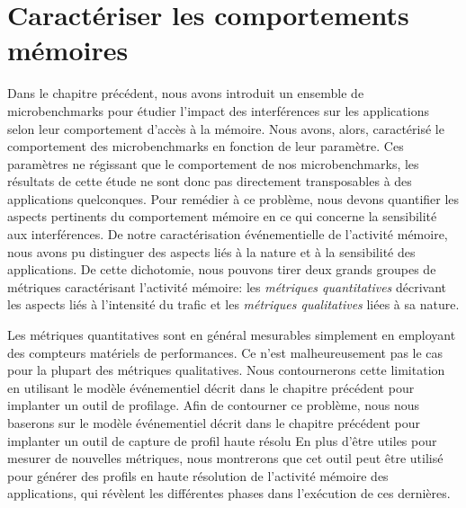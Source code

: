 
\chapter{\label{chapitre:caracterisation} Caractériser les comportements mémoires}



Dans le chapitre précédent, nous avons introduit un ensemble de microbenchmarks pour étudier l'impact des interférences sur les applications selon leur comportement d'accès à la mémoire.
Nous avons, alors, caractérisé le comportement des microbenchmarks en fonction de leur paramètre.
Ces paramètres ne régissant que le comportement de nos microbenchmarks, les résultats de cette étude ne sont donc pas directement transposables à des applications quelconques.
Pour remédier à ce problème, nous devons quantifier les aspects pertinents du comportement mémoire en ce qui concerne la sensibilité aux interférences.
De notre caractérisation événementielle de l'activité mémoire, nous avons pu distinguer des aspects liés à la nature et à la sensibilité des applications.
De cette dichotomie, nous pouvons tirer deux grands groupes de métriques caractérisant l'activité mémoire: les \emph{métriques quantitatives} décrivant les aspects liés à l'intensité du trafic et les \emph{métriques qualitatives} liées à sa nature.

Les métriques quantitatives sont en général mesurables simplement en employant des compteurs matériels de performances.
Ce n'est malheureusement pas le cas pour la plupart des métriques qualitatives.
Nous contournerons cette limitation en utilisant le modèle événementiel décrit dans le chapitre précédent pour implanter un outil de profilage.
Afin de contourner ce problème, nous nous baserons sur le modèle événementiel décrit dans le chapitre précédent pour implanter un outil de capture de profil haute résolu
En plus d'être utiles pour mesurer de nouvelles métriques, nous montrerons que cet outil peut être utilisé pour générer des profils en haute résolution de l'activité mémoire des applications, qui révèlent les différentes phases dans l'exécution de ces dernières.

